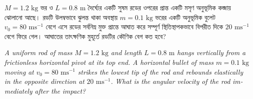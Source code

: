 \documentclass[12pt, a4paper]{article}
\begin{document}
\begin{tcolorbox}[questionbox={প্রশ্ন (Question) 48}]
    \noindent
    $M = 1.2\text{ kg}$ ভর ও $L = 0.8\text{ m}$ দৈর্ঘ্যের একটি সুষম রডের ওপরের প্রান্ত একটি মসৃণ অনুভূমিক কব্জায় ঝোলানো আছে। রডটি উলম্বভাবে ঝুলন্ত থাকা অবস্থায় $m = 0.1\text{ kg}$ ভরের একটি অনুভূমিক বুলেট $v_0 = 80\text{ ms}^{-1}$ বেগে এসে রডের সর্বনিম্ন মুক্ত প্রান্তে আঘাত করে সম্পূর্ণ স্থিতিস্থাপকভাবে বিপরীত দিকে $20\text{ ms}^{-1}$ বেগে ফিরে গেল। আঘাতের তাৎক্ষণিক মুহূর্তে রডটির কৌণিক বেগ কত হবে?
    
    \vspace{0.8em}
    \begin{english}
    \noindent\textit{\color{darkgray}
    A uniform rod of mass $M = 1.2\text{ kg}$ and length $L = 0.8\text{ m}$ hangs vertically from a frictionless horizontal pivot at its top end. A horizontal bullet of mass $m = 0.1\text{ kg}$ moving at $v_0 = 80\text{ ms}^{-1}$ strikes the lowest tip of the rod and rebounds elastically in the opposite direction at $20\text{ ms}^{-1}$. What is the angular velocity of the rod immediately after the impact?
    }
    \end{english}
\end{tcolorbox}

\vspace{1em}
\begin{center}
\end{center}
\vspace{1em}
\end{document}
